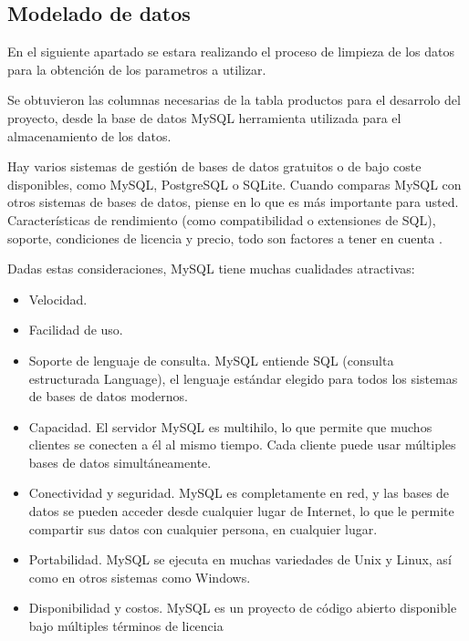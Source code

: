 \subsection{Modelado de datos}
En el siguiente apartado se estara realizando el proceso de limpieza de los
datos para la obtención de los parametros a utilizar.

\vspace{1\baselineskip}

Se obtuvieron las columnas necesarias de la tabla productos para el desarrolo
del proyecto, desde la base de datos MySQL herramienta utilizada para el
almacenamiento de los datos.

\vspace{1\baselineskip}
Hay varios sistemas de gestión de bases de datos gratuitos o de bajo coste disponibles, como MySQL, PostgreSQL o SQLite. Cuando comparas MySQL con otros sistemas de bases de datos, piense en lo que es más importante para usted. Características de rendimiento (como compatibilidad o extensiones de SQL),
soporte, condiciones de licencia y precio, todo son factores a tener en cuenta \cite{dubois2013mysql}.

Dadas estas consideraciones, MySQL tiene muchas cualidades atractivas:

\begin{itemize}
  \item Velocidad.
  \item Facilidad de uso.
  \item Soporte de lenguaje de consulta. MySQL entiende SQL (consulta estructurada
        Language), el lenguaje estándar elegido para todos los sistemas de bases de
        datos modernos.
  \item Capacidad. El servidor MySQL es multihilo, lo que permite que muchos clientes se conecten a él al mismo tiempo. Cada cliente puede usar múltiples bases de datos simultáneamente.
  \item Conectividad y seguridad. MySQL es completamente en red, y las bases de datos se pueden acceder desde cualquier lugar de Internet, lo que le permite compartir sus datos con cualquier persona, en cualquier lugar.
  \item Portabilidad. MySQL se ejecuta en muchas variedades de Unix y Linux, así como en otros sistemas como Windows.
  \item Disponibilidad y costos. MySQL es un proyecto de código abierto disponible bajo múltiples términos de licencia

\end{itemize}




